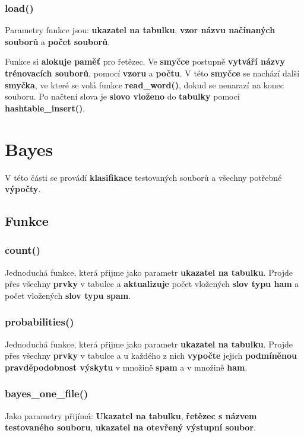 \documentclass[12pt]{report}
\begin{document}
			\subsubsection{load()}
			
			Parametry funkce jsou: \textbf{ukazatel na tabulku}, \textbf{vzor názvu načínaných souborů} a \textbf{počet souborů}.
			
			Funkce si \textbf{alokuje paměť} pro řetězec. Ve \textbf{smyčce}  postupně \textbf{vytváří názvy trénovacích souborů}, pomocí \textbf{vzoru} a \textbf{počtu}.
			V této \textbf{smyčce} se nachází další \textbf{smyčka}, ve které se volá funkce \textbf{read\_word()}, dokud se nenarazí na konec souboru. Po načtení slova je \textbf{slovo vloženo} do \textbf{tabulky} pomocí \textbf{hashtable\_insert()}.
			
			
		\section{Bayes}
		
		V této části se provádí \textbf{klasifikace} testovaných souborů a všechny potřebné \textbf{výpočty}.
		
		\subsection{Funkce}
			
			\subsubsection{count()}
			Jednoduchá funkce, která přijme jako parametr \textbf{ukazatel na tabulku}. Projde přes všechny \textbf{prvky} v tabulce a \textbf{aktualizuje} počet vložených \textbf{slov typu ham} a počet vložených \textbf{slov typu spam}.
			
			\subsubsection{probabilities()}
			Jednoduchá funkce, která přijme jako parametr \textbf{ukazatel na tabulku}. Projde přes všechny \textbf{prvky} v tabulce a u každého z nich \textbf{vypočte} jejich \textbf{podmíněnou pravděpodobnost výskytu} v množině \textbf{spam} a v množině \textbf{ham}.
			
			\subsubsection{bayes\_one\_file()}
			Jako parametry přijímá: \textbf{Ukazatel na tabulku}, \textbf{řetězec s názvem testovaného souboru}, \textbf{ukazatel na otevřený výstupní soubor}.
			
\end{document}
